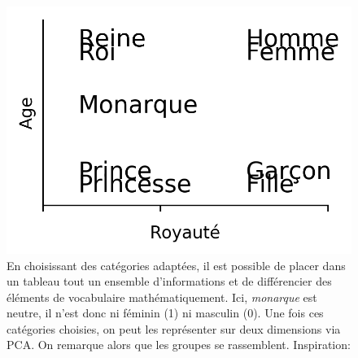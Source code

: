 \begin{figure}[h]
    \centering
    \noindent\begin{minipage}{.45\linewidth}
    \end{minipage}
    \begin{minipage}{.45\linewidth}
        \includegraphics[width=\linewidth]{figures/chap2/visualisation_embedding.png}
    \end{minipage}
    \caption{En choisissant des catégories adaptées, il est possible de placer dans un tableau tout un ensemble d'informations et de différencier des éléments de vocabulaire mathématiquement. Ici, \textit{monarque} est neutre, il n'est donc ni féminin (1) ni masculin (0). Une fois ces catégories choisies, on peut les représenter sur deux dimensions via PCA. On remarque alors que les groupes se rassemblent. Inspiration: \cite{lynn_get_2018}}
    \label{figure:deep-learning:projection-embedding}
\end{figure}